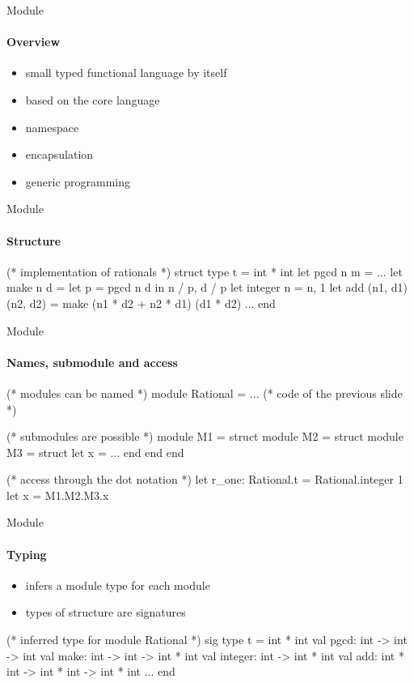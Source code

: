 \begin{frame}{Module}
  \framesubtitle{Overview}

  \begin{itemize}
  \item small typed functional language by itself
  \item based on the core language
  \item namespace
  \item encapsulation
  \item generic programming
  \end{itemize}

\end{frame}

\begin{frame}[fragile]{Module}
  \framesubtitle{Structure}

  \begin{ocamlcode}
(* implementation of rationals *)
struct
  type t = int * int
  let pgcd n m = ...
  let make n d = 
    let p = pgcd n d in
    n / p, d / p
  let integer n = n, 1
  let add (n1, d1) (n2, d2) = 
    make (n1 * d2 + n2 * d1) (d1 * d2)
  ...
end
  \end{ocamlcode}

\end{frame}

\begin{frame}[fragile]{Module}
  \framesubtitle{Names, submodule and access}

\begin{ocamlcode}
(* modules can be named *)
module Rational = 
  ... (* code of the previous slide *)

(* submodules are possible *)
module M1 = struct 
  module M2 = struct 
    module M3 = struct let x = ... end 
  end 
end

(* access through the dot notation *)
let r_one: Rational.t = Rational.integer 1
let x = M1.M2.M3.x
\end{ocamlcode}
\end{frame}

\begin{frame}[fragile]{Module}
  \framesubtitle{Typing}

  \begin{itemize}
  \item \ocaml infers a module type for each module
  \item types of structure are signatures
  \end{itemize}

  \begin{ocamlcode}
(* inferred type for module Rational *)
sig
  type t = int * int
  val pgcd: int -> int -> int
  val make: int -> int -> int * int
  val integer: int -> int * int
  val add: int * int -> int * int -> int * int
  ...
end
  \end{ocamlcode}
\end{frame}

